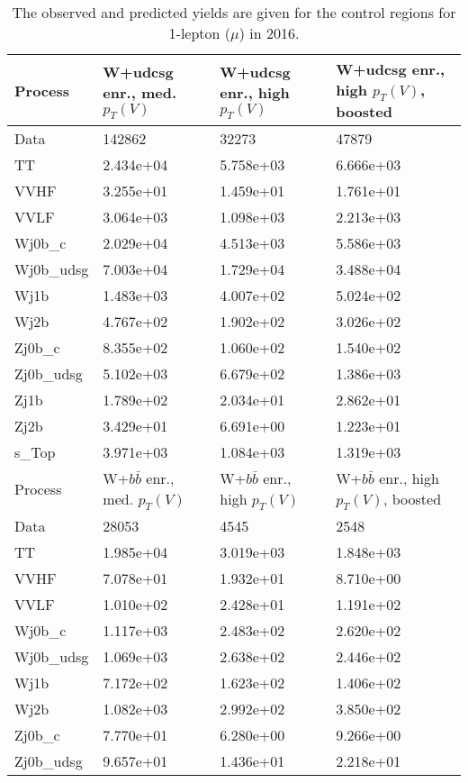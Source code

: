 \begin{table}
\centering
\caption[2016 1-lepton ($\mu$) control region yields]{
                  The observed and predicted yields are given for the
                  control regions for 1-lepton ($\mu$) in 2016.
                  }
{\footnotesize
\begin{tabularx}{0.8\textwidth}{|X|X|X|X|}
\hline
Process & W+udcsg enr., med. $p_{T}(V)$ & W+udcsg enr., high $p_{T}(V)$ & W+udcsg enr., high $p_{T}(V)$, boosted \\
\hline
Data & 142862 & 32273 & 47879 \\
\hline
TT & 2.434e+04 & 5.758e+03 & 6.666e+03 \\
VVHF & 3.255e+01 & 1.459e+01 & 1.761e+01 \\
VVLF & 3.064e+03 & 1.098e+03 & 2.213e+03 \\
Wj0b\_c & 2.029e+04 & 4.513e+03 & 5.586e+03 \\
Wj0b\_udsg & 7.003e+04 & 1.729e+04 & 3.488e+04 \\
Wj1b & 1.483e+03 & 4.007e+02 & 5.024e+02 \\
Wj2b & 4.767e+02 & 1.902e+02 & 3.026e+02 \\
Zj0b\_c & 8.355e+02 & 1.060e+02 & 1.540e+02 \\
Zj0b\_udsg & 5.102e+03 & 6.679e+02 & 1.386e+03 \\
Zj1b & 1.789e+02 & 2.034e+01 & 2.862e+01 \\
Zj2b & 3.429e+01 & 6.691e+00 & 1.223e+01 \\
s\_Top & 3.971e+03 & 1.084e+03 & 1.319e+03 \\
\hline
\hline
Process & W+$b\bar{b}$ enr., med. $p_{T}(V)$ & W+$b\bar{b}$ enr., high $p_{T}(V)$ & W+$b\bar{b}$ enr., high $p_{T}(V)$, boosted \\
\hline
Data & 28053 & 4545 & 2548 \\
\hline
TT & 1.985e+04 & 3.019e+03 & 1.848e+03 \\
VVHF & 7.078e+01 & 1.932e+01 & 8.710e+00 \\
VVLF & 1.010e+02 & 2.428e+01 & 1.191e+02 \\
Wj0b\_c & 1.117e+03 & 2.483e+02 & 2.620e+02 \\
Wj0b\_udsg & 1.069e+03 & 2.638e+02 & 2.446e+02 \\
Wj1b & 7.172e+02 & 1.623e+02 & 1.406e+02 \\
Wj2b & 1.082e+03 & 2.992e+02 & 3.850e+02 \\
Zj0b\_c & 7.770e+01 & 6.280e+00 & 9.266e+00 \\
Zj0b\_udsg & 9.657e+01 & 1.436e+01 & 2.218e+01 \\

\end{tabularx}}
\end{table}
